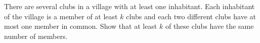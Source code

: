 There are several clubs in a village with at least one inhabitant.
Each inhabitant of the village is a member of at least $k$ clubs and each two different
clubs have at most one member in common.
Show that at least $k$ of these clubs have the same number of members.